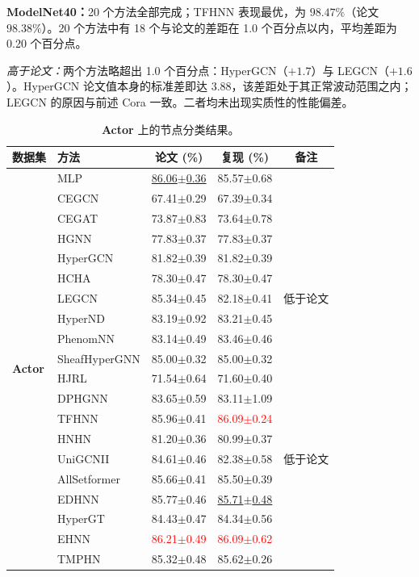 \documentclass[11pt,a4paper]{article}
\begin{document}
\par\smallskip
\noindent\textbf{ModelNet40：}20 个方法全部完成；TFHNN 表现最优，为 $98.47\%$（论文 $98.38\%$）。20 个方法中有 18 个与论文的差距在 1.0 个百分点以内，平均差距为 0.20 个百分点。

\noindent\textit{高于论文：}两个方法略超出 1.0 个百分点：HyperGCN（$+1.7$）与 LEGCN（$+1.6$）。HyperGCN 论文值本身的标准差即达 $3.88$，该差距处于其正常波动范围之内；LEGCN 的原因与前述 Cora 一致。二者均未出现实质性的性能偏差。

\begin{table}[H]
	\centering\small
	\begin{tabular}{llccc}
		\toprule
		数据集 & 方法 & 论文 (\%) & 复现 (\%) & 备注 \\
		\midrule
		\multirow{20}{*}{\textbf{Actor}} & MLP               & \underline{86.06$\pm$0.36}   & 85.57$\pm$0.68   &  \\
		 & CEGCN             & 67.41$\pm$0.29   & 67.39$\pm$0.34   &  \\
		 & CEGAT             & 73.87$\pm$0.83   & 73.64$\pm$0.78   &  \\
		 & HGNN              & 77.83$\pm$0.37   & 77.83$\pm$0.37   &  \\
		 & HyperGCN          & 81.82$\pm$0.39   & 81.82$\pm$0.39   &  \\
		 & HCHA              & 78.30$\pm$0.47   & 78.30$\pm$0.47   &  \\
		 & LEGCN             & 85.34$\pm$0.45   & 82.18$\pm$0.41   & 低于论文 \\
		 & HyperND           & 83.19$\pm$0.92   & 83.21$\pm$0.45   &  \\
		 & PhenomNN          & 83.14$\pm$0.49   & 83.46$\pm$0.46   &  \\
		 & SheafHyperGNN     & 85.00$\pm$0.32   & 85.00$\pm$0.32   &  \\
		 & HJRL              & 71.54$\pm$0.64   & 71.60$\pm$0.40   &  \\
		 & DPHGNN            & 83.65$\pm$0.59   & 83.11$\pm$1.09   &  \\
		 & TFHNN             & 85.96$\pm$0.41   & \textcolor{red}{86.09$\pm$0.24}   &  \\
		 & HNHN              & 81.20$\pm$0.36   & 80.99$\pm$0.37   &  \\
		 & UniGCNII          & 84.61$\pm$0.46   & 82.38$\pm$0.58   & 低于论文 \\
		 & AllSetformer      & 85.66$\pm$0.41   & 85.50$\pm$0.39   &  \\
		 & EDHNN             & 85.77$\pm$0.46   & \underline{85.71$\pm$0.48}   &  \\
		 & HyperGT           & 84.43$\pm$0.47   & 84.34$\pm$0.56   &  \\
		 & EHNN              & \textcolor{red}{86.21$\pm$0.49}   & \textcolor{red}{86.09$\pm$0.62}   &  \\
		 & TMPHN             & 85.32$\pm$0.48   & 85.62$\pm$0.26   &  \\
		\bottomrule
	\end{tabular}
	\caption{\textbf{Actor} 上的节点分类结果。}
\end{table}
\end{document}
